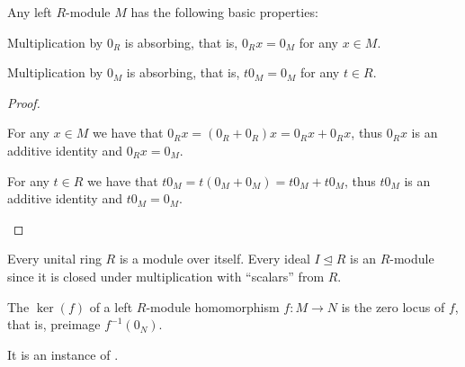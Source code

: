 \begin{proposition}\label{def:left_module_properties}
  Any left \( R \)-module \( M \) has the following basic properties:
  \begin{propenum}
     Multiplication by \( 0_R \) is absorbing, that is, \( 0_R x = 0_M \) for any \( x \in M \).

     Multiplication by \( 0_M \) is absorbing, that is, \( t 0_M = 0_M \) for any \( t \in R \).
  \end{propenum}
\end{proposition}
\begin{proof}\mbox{}
  \begin{itemize}
     For any \( x \in M \) we have that \( 0_R x = (0_R + 0_R)x = 0_R x + 0_R x \), thus \( 0_R x \) is an additive identity and \( 0_R x = 0_M \).

     For any \( t \in R \) we have that \( t 0_M = t (0_M + 0_M) = t 0_M + t 0_M \), thus \( t 0_M \) is an additive identity and \( t 0_M = 0_M \).
  \end{itemize}
\end{proof}

\begin{example}\label{ex:module/ideal_of_ring}
  Every unital ring \( R \) is a module over itself. Every ideal \( I \unlhd R \) is an \( R \)-module since it is closed under multiplication with \enquote{scalars} from \( R \).
\end{example}

\begin{definition}\label{def:left_module_kernel}
  The  \( \ker(f) \) of a left \( R \)-module homomorphism \( f: M \to N \) is the zero locus of \( f \), that is, preimage \( f^{-1}(0_N) \).

  It is an instance of .
\end{definition}

